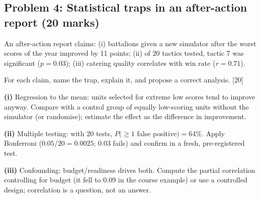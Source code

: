 \documentclass[11pt]{article}
\begin{document}
\subsection{Problem 4: Statistical traps in an after-action report \normalfont\small\color{GreyN}(20 marks)}

\begin{prob}An after-action report claims: (i) battalions given a new simulator after the worst scores of the year improved by 11 points; (ii) of 20 tactics tested, tactic 7 was significant ($p=0.03$); (iii) catering quality correlates with win rate ($r=0.71$).

For each claim, name the trap, explain it, and propose a correct analysis. [20]\end{prob}

\begin{soln}\textbf{(i)} Regression to the mean: units selected for extreme low scores tend to improve anyway. Compare with a control group of equally low-scoring units without the simulator (or randomise); estimate the effect as the difference in improvement.

\textbf{(ii)} Multiple testing: with 20 tests, $P(\ge1$ false positive$)=64\%$. Apply Bonferroni ($0.05/20=0.0025$; 0.03 fails) and confirm in a fresh, pre-registered test.

\textbf{(iii)} Confounding: budget/readiness drives both. Compute the partial correlation controlling for budget (it fell to 0.09 in the course example) or use a controlled design; correlation is a question, not an answer.\end{soln}
\end{document}
